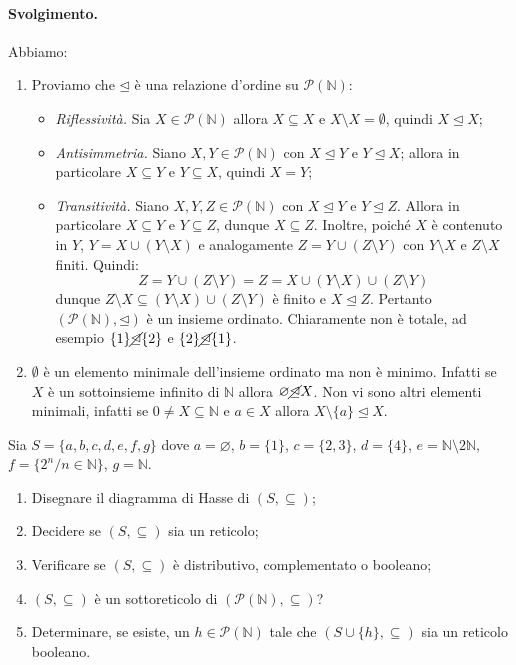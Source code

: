 \paragraph{Svolgimento.} Abbiamo:
\begin{enumerate}
	\item Proviamo che $\unlhd$ è una relazione d'ordine su $\mathcal{P}(\mathbb{N})$:
	\begin{itemize}
		\item \textit{Riflessività.} Sia $X \in \mathcal{P}(\mathbb{N})$ allora $X \subseteq X$ e $X \setminus X = \emptyset$, quindi $X \unlhd X$;
		\item \textit{Antisimmetria.} Siano $X,Y \in \mathcal{P}(\mathbb{N})$ con $X \unlhd Y$ e $Y \unlhd X$; allora in particolare $X \subseteq Y$ e $Y \subseteq X$, quindi $X=Y$;
		\item \textit{Transitività.} Siano $X,Y,Z \in \mathcal{P}(\mathbb{N})$ con $X \unlhd Y$ e $Y \unlhd Z$. Allora in particolare $X \subseteq Y$ e $Y \subseteq Z$, dunque $X \subseteq Z$. Inoltre, poiché $X$ è contenuto in $Y$, $Y=X \cup (Y \setminus X)$ e analogamente $Z = Y \cup (Z \setminus Y)$ con $Y \setminus X$ e $Z \setminus X$ finiti. Quindi:
		\begin{displaymath}
			Z = Y \cup (Z \setminus Y) = Z = X \cup (Y \setminus X) \cup (Z \setminus Y)
		\end{displaymath}
		dunque $Z \setminus X \subseteq (Y \setminus X) \cup (Z \setminus Y)$ è finito e $X \unlhd Z$. Pertanto $(\mathcal{P}(\mathbb{N}),\unlhd)$ è un insieme ordinato. Chiaramente non è totale, ad esempio $\{1\} \cancel{\unlhd} \{2\}$ e $\{2\} \cancel{\unlhd} \{1\}$.
	\end{itemize}
	\item $\emptyset$ è un elemento minimale dell'insieme ordinato ma non è minimo. Infatti se $X$ è un sottoinsieme infinito di $\mathbb{N}$ allora $\varnothing \cancel{\unlhd} X$. Non vi sono altri elementi minimali, infatti se $0 \neq X \subseteq \mathbb{N}$ e $a \in X$ allora $X \setminus \{a\} \unlhd X$. \hfill \blacksquare
\end{enumerate}

\begin{exsbox}
	Sia $S=\{a,b,c,d,e,f,g\}$ dove $a=\varnothing$, $b=\{1\}$, $c=\{2,3\}$, $d=\{4\}$, $e= \mathbb{N}\setminus 2\mathbb{N}$, $f=\{2^{n}/n \in \mathbb{N}\}$, $g=\mathbb{N}$.
	\begin{enumerate}
		\item Disegnare il diagramma di Hasse di $(S,\subseteq)$;
		\item Decidere se $(S,\subseteq)$ sia un reticolo;
		\item Verificare se $(S,\subseteq)$ è distributivo, complementato o booleano;
		\item $(S,\subseteq)$ è un sottoreticolo di $(\mathcal{P}(\mathbb{N}),\subseteq)$?
		\item Determinare, se esiste, un $h \in \mathcal{P}(\mathbb{N})$ tale che $(S \cup \{h\},\subseteq)$ sia un reticolo booleano.
	\end{enumerate}
\end{exsbox}

